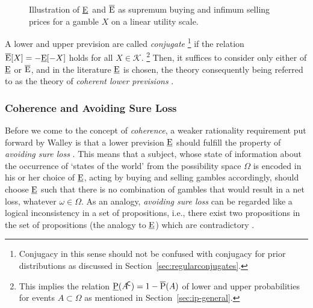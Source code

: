 \begin{figure}
\centering
{}
\caption[Illustration of \underline{E}\ and $\Eu$ as supremum buying and infimum selling prices]{\label{fig:pricesforgambles}%
Illustration of \underline{E}\ and $\Eu$ as supremum buying and infimum selling prices for a gamble $X$ on a linear utility scale.}
\end{figure}

A lower and upper prevision are called \emph{conjugate}%
\footnote{Conjugacy in this sense should not be confused
with conjugacy for prior distributions as discussed in Section~\ref{sec:regularconjugates}.}
if the relation $\overline{\operatorname{E}}[X] = -\underline{\operatorname{E}}[-X]$ holds for all $X \in \mathcal{K}$.%
\footnote{This implies the relation $\underline{\operatorname{P}}(A^{{\mbox{\!\scriptsize\textsf{C}}}}) = 1 - \overline{\operatorname{P}}(A)$
of lower and upper probabilities for events $A \subset \Omega$
as mentioned in Section~\ref{sec:ip-general}.}
Then, it suffices to consider only either of $\underline{\operatorname{E}}$ or $\Eu$,
and in the literature $\underline{\operatorname{E}}$ is chosen,
the theory consequently being referred to as the theory of
\emph{coherent lower previsions} \parencite[see, e.g.,][\S 3.2]{itip}.

\subsubsection{Coherence and Avoiding Sure Loss}

Before we come to the concept of \emph{coherence},
a weaker rationality requirement put forward by Walley is
that a lower prevision $\underline{\operatorname{E}}$ should fulfill the property of
\emph{avoiding sure loss} \parencite[\S 2.4]{1991:walley}.
This means that a subject, whose state of information about the
occurrence of `states of the world' from the possibility space $\Omega$
is encoded in his or her choice of $\underline{\operatorname{E}}$,
acting by buying and selling gambles accordingly,
should choose $\underline{\operatorname{E}}$ such that there is no combination of gambles
that would result in a net loss, whatever $\omega \in \Omega$.
As an analogy, \emph{avoiding sure loss} can be regarded
like a logical inconsistency in a set of propositions,
i.e., there exist two propositions in the set of propositions
(the analogy to $\underline{\operatorname{E}}$) which are contradictory
\parencite[\S 2.4, footnote~1]{1991:walley}.

